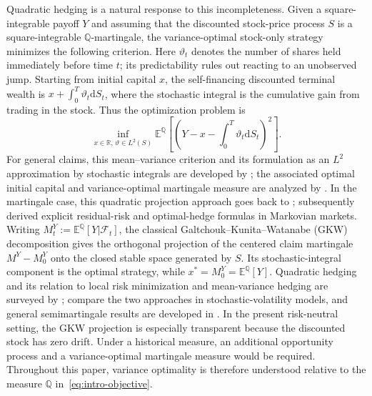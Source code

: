 \documentclass[11pt]{article}
\theoremstyle{definition}
\theoremstyle{remark}
\newcommand{\R}{\mathbb{R}}
\newcommand{\E}{\mathbb{E}}
\newcommand{\Q}{\mathbb{Q}}
\newcommand{\F}{\mathcal{F}}
\newcommand{\1}{\mathbf{1}}
\newcommand{\dd}{\mathrm{d}}
\begin{document}
Quadratic hedging is a natural response to this incompleteness. Given a
square-integrable payoff $Y$ and assuming that the discounted stock-price
process $S$ is a square-integrable $\Q$-martingale, the variance-optimal
stock-only strategy minimizes the following criterion. Here $\vartheta_t$
denotes the number of shares held immediately before time $t$; its
predictability rules out reacting to an unobserved jump. Starting from initial
capital $x$, the self-financing discounted terminal wealth is
$x+\int_0^T\vartheta_t\dd S_t$, where the stochastic integral is the cumulative
gain from trading in the stock. Thus the optimization problem is
\begin{equation}
\label{eq:intro-objective}
 \inf_{x\in\R,\,\vartheta\in L^2(S)}
 \E^{\Q}\left[
   \left(Y-x-\int_0^T\vartheta_t\dd S_t\right)^2
 \right].
\end{equation}
For general claims, this mean--variance criterion and its formulation as an
$L^2$ approximation by stochastic integrals are developed by
\citet{schweizer1992,schweizer1994}; the associated optimal initial capital
and variance-optimal martingale measure are analyzed by
\citet{schweizer1996}.
In the martingale case, this quadratic projection approach goes back to
\citet{foellmersondermann1986}; \citet{bouleaulamberton1989} subsequently
derived explicit residual-risk and optimal-hedge formulas in Markovian
markets. Writing
$M_t^Y:=\E^\Q[Y|\F_t]$, the classical Galtchouk--Kunita--Watanabe (GKW)
decomposition \citep{galtchouk1976,kunitawatanabe1967} gives the orthogonal
projection of the centered claim martingale
$M^Y-M_0^Y$ onto the closed stable space generated by $S$. Its
stochastic-integral component is the optimal strategy, while
$x^*=M_0^Y=\E^\Q[Y]$. Quadratic hedging
and its relation to local risk minimization and mean-variance hedging are
surveyed by \citet{schweizer2001}; \citet{heathplatenschweizer2001} compare
the two approaches in stochastic-volatility models, and general semimartingale
results are developed in \citet{cernykallsen2007}. In the present risk-neutral setting, the GKW
projection is especially transparent because the discounted stock has zero
drift. Under a historical measure, an additional opportunity process and a
variance-optimal martingale measure would be required. Throughout this paper,
variance optimality is therefore understood relative to the measure $\Q$ in~\eqref{eq:intro-objective}.
\end{document}
